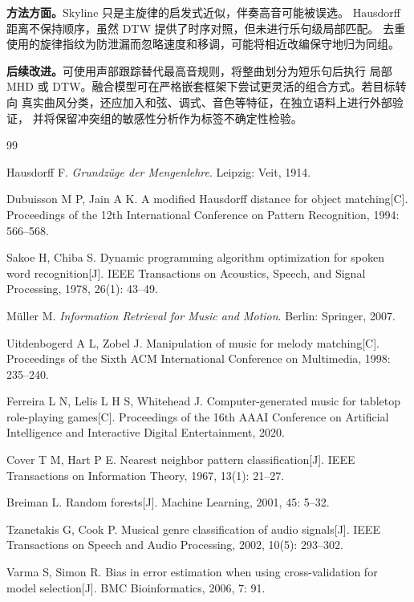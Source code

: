 \documentclass[UTF8,a4paper,12pt]{ctexart}
\begin{document}
\textbf{方法方面。}Skyline 只是主旋律的启发式近似，伴奏高音可能被误选。
Hausdorff 距离不保持顺序，虽然 DTW 提供了时序对照，但未进行乐句级局部匹配。
去重使用的旋律指纹为防泄漏而忽略速度和移调，可能将相近改编保守地归为同组。

\textbf{后续改进。}可使用声部跟踪替代最高音规则，将整曲划分为短乐句后执行
局部 MHD 或 DTW。融合模型可在严格嵌套框架下尝试更灵活的组合方式。若目标转向
真实曲风分类，还应加入和弦、调式、音色等特征，在独立语料上进行外部验证，
并将保留冲突组的敏感性分析作为标签不确定性检验。

{\small
\begin{thebibliography}{99}
\setlength{\itemsep}{0.15em}

Hausdorff F. \textit{Grundz\"uge der Mengenlehre}. Leipzig: Veit, 1914.

Dubuisson M P, Jain A K. A modified Hausdorff distance for object matching[C].
Proceedings of the 12th International Conference on Pattern Recognition, 1994:
566--568.

Sakoe H, Chiba S. Dynamic programming algorithm optimization for spoken word
recognition[J]. IEEE Transactions on Acoustics, Speech, and Signal Processing,
1978, 26(1): 43--49.

M\"uller M. \textit{Information Retrieval for Music and Motion}. Berlin:
Springer, 2007.

Uitdenbogerd A L, Zobel J. Manipulation of music for melody matching[C].
Proceedings of the Sixth ACM International Conference on Multimedia, 1998:
235--240.

Ferreira L N, Lelis L H S, Whitehead J. Computer-generated music for tabletop
role-playing games[C]. Proceedings of the 16th AAAI Conference on Artificial
Intelligence and Interactive Digital Entertainment, 2020.

Cover T M, Hart P E. Nearest neighbor pattern classification[J].
IEEE Transactions on Information Theory, 1967, 13(1): 21--27.

Breiman L. Random forests[J]. Machine Learning, 2001, 45: 5--32.

Tzanetakis G, Cook P. Musical genre classification of audio signals[J].
IEEE Transactions on Speech and Audio Processing, 2002, 10(5): 293--302.

Varma S, Simon R. Bias in error estimation when using cross-validation for
model selection[J]. BMC Bioinformatics, 2006, 7: 91.


\end{thebibliography}}
\end{document}
